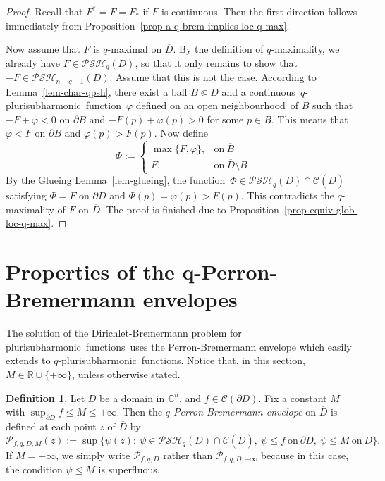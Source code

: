 \documentclass[reqno]{amsart}
\theoremstyle{definition}
\newtheorem{defn}[thm]{Definition}
\numberwithin{equation}{section}
\newcommand{\cbb}{\mathbb{C}}
\newcommand{\rbb}{\mathbb{R}}
\newcommand{\ccal}{\mathcal{C}}
\newcommand{\pcal}{\mathcal{P}}
\newcommand{\psh}{pluri\-sub\-harmonic}
\newcommand{\qpsh}{$q$-pluri\-sub\-harmonic}
\newcommand{\PSH}{\mathcal{PSH}}
\newcommand{\cl}[1]{\overline{#1}}
\newcommand{\nbh}{neighbourhood}
\newcommand{\cont}{continuous}
\newcommand{\fct}{function}
\newcommand{\fcts}{functions}
\newcommand{\cld}{\overline{D}}
\newcommand{\relc}{\Subset}
\begin{document}
\begin{proof} Recall that $F^*=F=F_*$ if $F$ is \cont. Then the first direction follows immediately from Proposition~\ref{prop-a-q-brem-implies-loc-q-max}.

Now assume that $F$ is $q$-maximal on $\cld$. By the definition of $q$-maximality, we already have $F \in \PSH_q(D)$, so that it only remains to show that $-F \in \PSH_{n-q-1}(D)$. Assume that this is not the case. According to Lemma~\ref{lem-char-qpsh}, there exist a ball $B \relc D$ and a \cont\ \qpsh\ \fct\ $\varphi$ defined on an open \nbh\ of $\cl{B}$ such that $-F+\varphi<0$ on $\partial B$ and $-F(p)+\varphi(p)>0$ for some $p \in B$. This means that $\varphi < F$ on $\partial B$ and $\varphi(p)>F(p)$. Now define
\[
\Phi:=\begin{cases} \max\{F,\varphi\}, & \text{on}\ \cl{B}\\ F, & \text{on}\ \cld\setminus B \end{cases}
\]
By the Glueing Lemma~\ref{lem-glueing}, the \fct\ $\Phi \in \PSH_q(D) \cap \ccal(\cld)$ satisfying $\Phi = F$ on $\partial D$ and $\Phi(p)=\varphi(p)>F(p)$. This contradicts the $q$-maximality of $F$ on $\cld$. The proof is finished due to Proposition~\ref{prop-equiv-glob-loc-q-max}.
\end{proof}






\section{Properties of the q-Perron-Bremermann envelopes}

The solution of the Dirichlet-Bremermann problem for \psh\ \fcts\ uses the Perron-Bremermann envelope which easily extends to \qpsh\ \fcts. Notice that, in this section, $M \in \rbb\cup\{+\infty\}$, unless otherwise stated.

\begin{defn}\label{defn-q-Perron}  Let $D$ be a domain in $\cbb^n$, and $f \in \ccal(\partial D)$.  Fix a constant $M$ with $\sup_{\partial D} f \leq M \leq +\infty$. Then the \textit{$q$-Perron-Bremermann envelope} on $\cld$ is defined at each point $z$ of $\cld$ by
\[
\pcal_{f,q,D,M}(z):=\sup\{\psi(z) : \ \psi \in \PSH_q(D)\cap \ccal(\cld), \ \psi \leq f \ \text{on}\ \partial D, \ \psi \leq M \ \text{on}\ \cld\}.
\]
If $M=+\infty$, we simply write $\pcal_{f,q,D}$ rather than $\pcal_{f,q,D,+\infty}$ because in this case, the condition $\psi \leq M$ is superfluous.
\end{defn}
\end{document}
